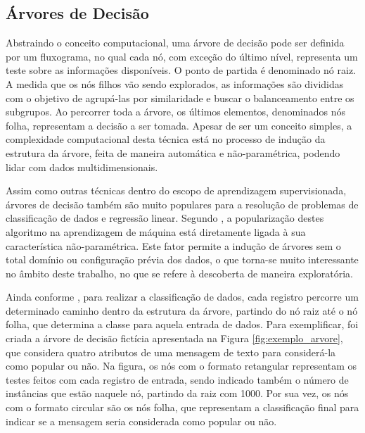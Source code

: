 \documentclass[oneside,openright,12pt]{ufsm_2015} %
\begin{document}

\subsection{Árvores de Decisão}
\label{sec:fund-arvores-decisao}

    \par Abstraindo o conceito computacional, uma árvore de decisão pode ser definida por um fluxograma, no qual cada nó, com exceção do último nível, representa um teste sobre as informações disponíveis. O ponto de partida é denominado nó raiz. A medida que os nós filhos vão sendo explorados, as informações são divididas com o objetivo de agrupá-las por similaridade e buscar o balanceamento entre os subgrupos. Ao percorrer toda a árvore, os últimos elementos, denominados nós folha, representam a decisão a ser tomada. Apesar de ser um conceito simples, a complexidade computacional desta técnica está no processo de indução da estrutura da árvore, feita de maneira automática e não-paramétrica, podendo lidar com dados multidimensionais. 
    
    \par Assim como outras técnicas dentro do escopo de aprendizagem supervisionada, árvores de decisão também são muito populares para a resolução de problemas de classificação de dados e regressão linear. Segundo \cite{book:han:11}, a popularização destes algoritmo na aprendizagem de máquina está diretamente ligada à sua característica não-paramétrica. Este fator permite a indução de árvores sem o total domínio ou configuração prévia dos dados, o que torna-se muito interessante no âmbito deste trabalho, no que se refere à descoberta de maneira exploratória.
    
    \par Ainda conforme \cite{book:han:11}, para realizar a classificação de dados, cada registro percorre um determinado caminho dentro da estrutura da árvore, partindo do nó raiz até o nó folha, que determina a classe para aquela entrada de dados. Para exemplificar, foi criada a árvore de decisão fictícia apresentada na Figura \ref{fig:exemplo_arvore}, que considera quatro atributos de uma mensagem de texto para considerá-la como popular ou não. Na figura, os nós com o formato retangular representam os testes feitos com cada registro de entrada, sendo indicado também o número de instâncias que estão naquele nó, partindo da raiz com 1000. Por sua vez, os nós com o formato circular são os nós folha, que representam a classificação final para indicar se a mensagem seria considerada como popular ou não.
    
\end{document}
